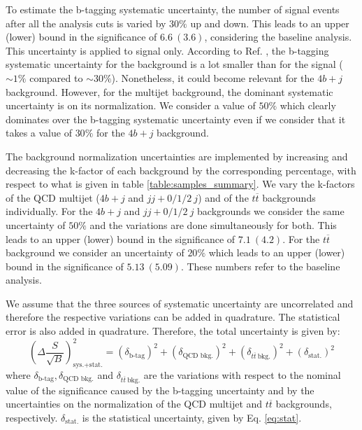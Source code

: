 To estimate the b-tagging systematic uncertainty, the number of signal events after all the analysis cuts is varied by $30\%$ up and down. This leads to an upper (lower) bound in the significance of $6.6~(3.6)$, considering the baseline analysis. This uncertainty is applied to signal only. According to Ref. \cite{hh2bbbbATLAS1}, the b-tagging systematic uncertainty for the background is a lot smaller than for the signal ($\sim 1\%$ compared to $\sim30\%$). Nonetheless, it could become relevant for the $4b+j$ background. However, for the multijet background, the dominant systematic uncertainty is on its normalization. We consider a value of $50\%$ which clearly dominates over the b-tagging systematic uncertainty even if we consider that it takes a value of $30\%$ for the $4b+j$ background.

The background normalization uncertainties are implemented by increasing and decreasing the k-factor of each background by the corresponding percentage, with respect to what is given in table \ref{table:samples_summary}. We vary the k-factors of the QCD multijet ($4b+j$ and $jj+0/1/2 ~j$) and of the $t\overline{t}$ backgrounds individually. For the $4b+j$ and $jj+0/1/2 ~j$ backgrounds we consider the same uncertainty of $50\%$ and the variations are done simultaneously for both. This leads to an upper (lower) bound in the significance of $7.1~(4.2)$. For the $t\overline{t}$ background we consider an uncertainty of $20\%$ which leads to an upper (lower) bound in the significance of $5.13~(5.09)$. These numbers refer to the baseline analysis.

We assume that the three sources of systematic uncertainty are uncorrelated and therefore the respective variations can be added in quadrature. The statistical error is also added in quadrature. Therefore, the total uncertainty is given by:
\begin{equation}
	\left(\Delta\frac{S}{\sqrt{B}}\right)_{\text{sys.+stat.}}^2=\left(\delta_{\text{b-tag}}\right)^2+\left(\delta_{\text{QCD bkg.}}\right)^2+\left(\delta_{t\overline{t}~\text{bkg.}}\right)^2+\left(\delta_{\text{stat.}}\right)^2
\end{equation}
where $\delta_{\text{b-tag}},\delta_{\text{QCD bkg.}}$ and $\delta_{t\overline{t}~\text{bkg.}}$ are the variations with respect to the nominal value of the significance caused by the b-tagging uncertainty and by the uncertainties on the normalization of the  QCD multijet and $t\overline{t}$ backgrounds, respectively. $\delta_{\text{stat.}}$ is the statistical uncertainty, given by Eq. \ref{eq:stat}. 

